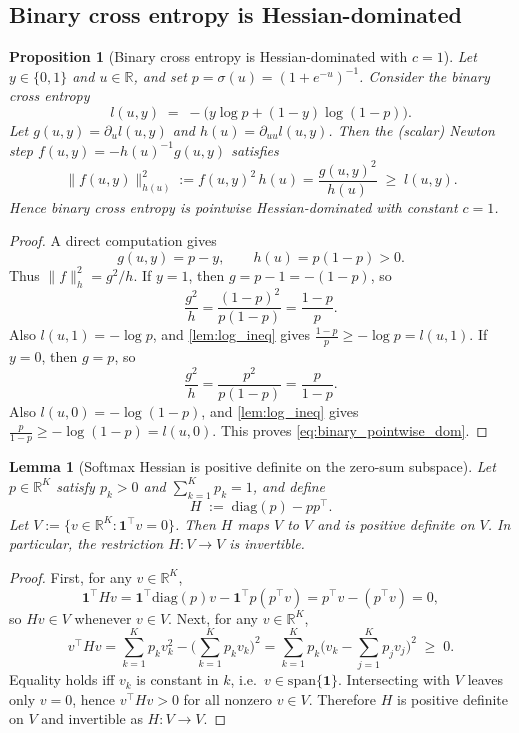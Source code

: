 \documentclass{article}
\theoremstyle{plain}
\newtheorem{proposition}[theorem]{Proposition}
\newtheorem{lemma}[theorem]{Lemma}
\theoremstyle{definition}
\theoremstyle{remark}
\begin{document}
\subsection{Binary cross entropy is Hessian-dominated}

\begin{proposition}[Binary cross entropy is Hessian-dominated with $c=1$]
\label{prop:binary_ce_hessdom}
Let $y\in\{0,1\}$ and $u\in\mathbb{R}$, and set $p=\sigma(u)=(1+e^{-u})^{-1}$.
Consider the binary cross entropy
\[
l(u,y) \;=\; -\Big(y\log p + (1-y)\log(1-p)\Big).
\]
Let $g(u,y)=\partial_u l(u,y)$ and $h(u)=\partial_{uu}l(u,y)$.
Then the (scalar) Newton step $f(u,y)=-h(u)^{-1}g(u,y)$ satisfies
\begin{equation}
\label{eq:binary_pointwise_dom}
\|f(u,y)\|_{h(u)}^2 := f(u,y)^2\,h(u)
= \frac{g(u,y)^2}{h(u)}
\;\ge\; l(u,y).
\end{equation}
Hence binary cross entropy is pointwise Hessian-dominated with constant $c=1$.
\end{proposition}

\begin{proof}
A direct computation gives
\[
g(u,y)=p-y,\qquad h(u)=p(1-p)>0.
\]
Thus $\|f\|_{h}^2 = g^2/h$. If $y=1$, then $g=p-1=-(1-p)$, so
\[
\frac{g^2}{h}=\frac{(1-p)^2}{p(1-p)}=\frac{1-p}{p}.
\]
Also $l(u,1)=-\log p$, and \cref{lem:log_ineq} gives
$\frac{1-p}{p}\ge -\log p=l(u,1)$. If $y=0$, then $g=p$, so
\[
\frac{g^2}{h}=\frac{p^2}{p(1-p)}=\frac{p}{1-p}.
\]
Also $l(u,0)=-\log(1-p)$, and \cref{lem:log_ineq} gives
$\frac{p}{1-p}\ge -\log(1-p)=l(u,0)$. This proves \eqref{eq:binary_pointwise_dom}.
\end{proof}

\begin{lemma}[Softmax Hessian is positive definite on the zero-sum subspace]
\label{lem:softmax_hess_posdef}
Let $p\in\mathbb{R}^K$ satisfy $p_k>0$ and $\sum_{k=1}^K p_k=1$, and define
\[
H \;:=\; \mathrm{diag}(p)-pp^\top.
\]
Let $V:=\{v\in\mathbb{R}^K:\mathbf{1}^\top v=0\}$. Then $H$ maps $V$ to $V$ and is
positive definite on $V$. In particular, the restriction $H:V\to V$ is invertible.
\end{lemma}

\begin{proof}
First, for any $v\in\mathbb{R}^K$,
\[
\mathbf{1}^\top H v
= \mathbf{1}^\top \mathrm{diag}(p)v - \mathbf{1}^\top p (p^\top v)
= p^\top v - (p^\top v) = 0,
\]
so $Hv\in V$ whenever $v\in V$. Next, for any $v\in\mathbb{R}^K$,
\[
v^\top H v
= \sum_{k=1}^K p_k v_k^2 - \Big(\sum_{k=1}^K p_k v_k\Big)^2
= \sum_{k=1}^K p_k\big(v_k-\sum_{j=1}^K p_j v_j\big)^2 \;\ge\; 0.
\]
Equality holds iff $v_k$ is constant in $k$, i.e.\ $v\in\mathrm{span}\{\mathbf{1}\}$.
Intersecting with $V$ leaves only $v=0$, hence $v^\top H v>0$ for all nonzero
$v\in V$. Therefore $H$ is positive definite on $V$ and invertible as $H:V\to V$.
\end{proof}
\end{document}
